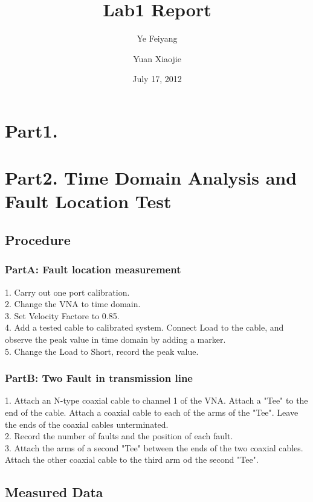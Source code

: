 \documentclass[11pt,oneside,a4paper]{report}
\begin{document}
\title{Lab1 Report}
\author{Ye Feiyang \and Yuan Xiaojie}
\date{July 17, 2012}
\maketitle

\chapter*{Part1. }

\chapter*{Part2. Time Domain Analysis and Fault Location Test}

\section*{Procedure}
\subsection*{PartA: Fault location measurement}
1. Carry out one port calibration.\\
2. Change the VNA to time domain.\\
3. Set Velocity Factore to 0.85.\\
4. Add a tested cable to calibrated system. Connect Load to the cable, and observe the peak value in time domain by adding a marker.\\
5. Change the Load to Short, record the peak value.
\subsection*{PartB: Two Fault in transmission line}
1. Attach an N-type coaxial cable to channel 1 of the VNA. Attach a "Tee" to the end of the cable. Attach a coaxial cable to each of the arms of the "Tee". Leave the ends of the coaxial cables unterminated.\\
2. Record the number of faults and the position of each fault.\\
3. Attach the arms of a second "Tee" between the ends of the two coaxial cables. Attach the other coaxial cable to the third arm od the second "Tee".\\

\section*{Measured Data}
\end{document}
